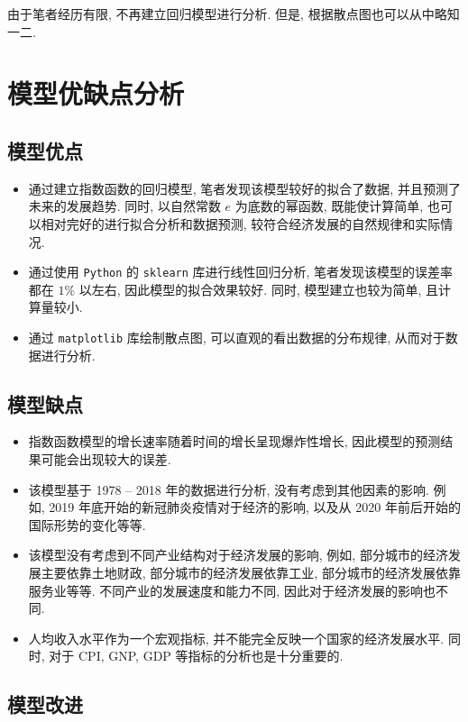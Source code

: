 \documentclass{article}
\begin{document}
由于笔者经历有限, 不再建立回归模型进行分析. 但是, 根据散点图也可以从中略知一二.

\section{模型优缺点分析}\label{sec:advantage}

\subsection{模型优点}

\begin{itemize}
  \item 通过建立指数函数的回归模型, 笔者发现该模型较好的拟合了数据, 并且预测了未来的发展趋势. 同时, 以自然常数 $e$ 为底数的幂函数, 既能使计算简单, 也可以相对完好的进行拟合分析和数据预测, 较符合经济发展的自然规律和实际情况.
  \item 通过使用 \texttt{Python} 的 \texttt{sklearn} 库进行线性回归分析, 笔者发现该模型的误差率都在 $1\%$ 以左右, 因此模型的拟合效果较好. 同时, 模型建立也较为简单, 且计算量较小.
  \item 通过 \texttt{matplotlib} 库绘制散点图, 可以直观的看出数据的分布规律, 从而对于数据进行分析.
\end{itemize}

\subsection{模型缺点}

\begin{itemize}
  \item 指数函数模型的增长速率随着时间的增长呈现爆炸性增长, 因此模型的预测结果可能会出现较大的误差.
  \item 该模型基于 1978 -- 2018 年的数据进行分析, 没有考虑到其他因素的影响. 例如, 2019 年底开始的新冠肺炎疫情对于经济的影响, 以及从 2020 年前后开始的国际形势的变化等等.
  \item 该模型没有考虑到不同产业结构对于经济发展的影响, 例如, 部分城市的经济发展主要依靠土地财政, 部分城市的经济发展依靠工业, 部分城市的经济发展依靠服务业等等. 不同产业的发展速度和能力不同, 因此对于经济发展的影响也不同.
  \item 人均收入水平作为一个宏观指标, 并不能完全反映一个国家的经济发展水平. 同时, 对于 CPI, GNP, GDP 等指标的分析也是十分重要的.
\end{itemize}

\subsection{模型改进}
\end{document}
